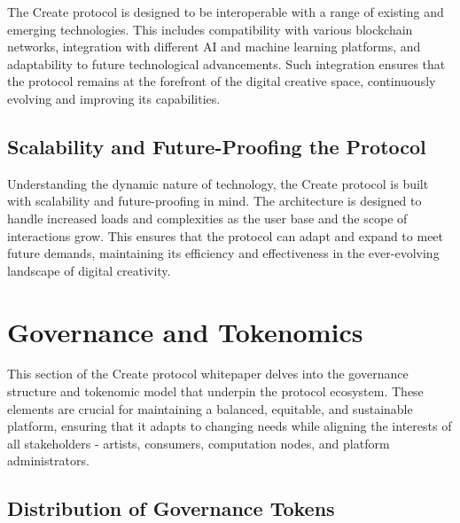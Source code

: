 \documentclass[12pt,a4paper]{article}
\begin{document}
The Create protocol is designed to be interoperable with a range of existing and emerging technologies. This includes compatibility with various blockchain networks, integration with different AI and machine learning platforms, and adaptability to future technological advancements. Such integration ensures that the protocol remains at the forefront of the digital creative space, continuously evolving and improving its capabilities.

\subsection{Scalability and Future-Proofing the Protocol}

Understanding the dynamic nature of technology, the Create protocol is built with scalability and future-proofing in mind. The architecture is designed to handle increased loads and complexities as the user base and the scope of interactions grow. This ensures that the protocol can adapt and expand to meet future demands, maintaining its efficiency and effectiveness in the ever-evolving landscape of digital creativity.

\noindent{}

\pagebreak

\section{Governance and Tokenomics}

This section of the Create protocol whitepaper delves into the governance structure and tokenomic model that underpin the protocol ecosystem. These elements are crucial for maintaining a balanced, equitable, and sustainable platform, ensuring that it adapts to changing needs while aligning the interests of all stakeholders - artists, consumers, computation nodes, and platform administrators.

\subsection{Distribution of Governance Tokens}
\end{document}
